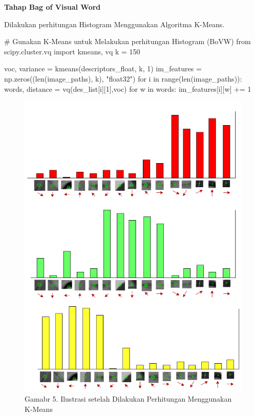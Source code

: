 \documentclass[
  letterpaper,
  DIV=11,
  numbers=noendperiod]{scrreprt}
\newenvironment{Shaded}{\begin{snugshade}}{\end{snugshade}}
\newcommand{\BuiltInTok}[1]{\textcolor[rgb]{0.00,0.23,0.31}{#1}}
\newcommand{\CommentTok}[1]{\textcolor[rgb]{0.37,0.37,0.37}{#1}}
\newcommand{\ControlFlowTok}[1]{\textcolor[rgb]{0.00,0.23,0.31}{#1}}
\newcommand{\DecValTok}[1]{\textcolor[rgb]{0.68,0.00,0.00}{#1}}
\newcommand{\ImportTok}[1]{\textcolor[rgb]{0.00,0.46,0.62}{#1}}
\newcommand{\KeywordTok}[1]{\textcolor[rgb]{0.00,0.23,0.31}{#1}}
\newcommand{\NormalTok}[1]{\textcolor[rgb]{0.00,0.23,0.31}{#1}}
\newcommand{\OperatorTok}[1]{\textcolor[rgb]{0.37,0.37,0.37}{#1}}
\newcommand{\StringTok}[1]{\textcolor[rgb]{0.13,0.47,0.30}{#1}}
\begin{document}
\textbf{Tahap Bag of Visual Word}

Dilakukan perhitungan Histogram Menggunakan Algoritma K-Means.

\begin{Shaded}
\begin{Highlighting}[]
\CommentTok{\# Gunakan K{-}Means untuk Melakukan perhitungan Histogram (BoVW)}
\ImportTok{from}\NormalTok{ scipy.cluster.vq }\ImportTok{import}\NormalTok{ kmeans, vq}
\NormalTok{k }\OperatorTok{=} \DecValTok{150}  

\NormalTok{voc, variance }\OperatorTok{=}\NormalTok{ kmeans(descriptors\_float, k, }\DecValTok{1}\NormalTok{) }
\NormalTok{im\_features }\OperatorTok{=}\NormalTok{ np.zeros((}\BuiltInTok{len}\NormalTok{(image\_paths), k), }\StringTok{"float32"}\NormalTok{)}
\ControlFlowTok{for}\NormalTok{ i }\KeywordTok{in} \BuiltInTok{range}\NormalTok{(}\BuiltInTok{len}\NormalTok{(image\_paths)):}
\NormalTok{    words, distance }\OperatorTok{=}\NormalTok{ vq(des\_list[i][}\DecValTok{1}\NormalTok{],voc)}
    \ControlFlowTok{for}\NormalTok{ w }\KeywordTok{in}\NormalTok{ words:}
\NormalTok{        im\_features[i][w] }\OperatorTok{+=} \DecValTok{1}
\end{Highlighting}
\end{Shaded}

\begin{figure}

{\centering \includegraphics{Asset/perhitunganHistogram.png}

}

\caption{Gamabr 5. Ilustrasi setelah Dilakukan Perhitungan Menggunakan
K-Means}

\end{figure}
\end{document}
